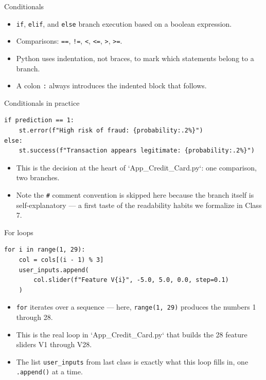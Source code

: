 \begin{frame}{Conditionals}
\begin{itemize}
\item \texttt{if}, \texttt{elif}, and \texttt{else} branch execution based on a boolean expression.
\item Comparisons: \texttt{==}, \texttt{!=}, \texttt{<}, \texttt{<=}, \texttt{>}, \texttt{>=}.
\item Python uses indentation, not braces, to mark which statements belong to a branch.
\item A colon \texttt{:} always introduces the indented block that follows.
\end{itemize}
\coursefooter
\end{frame}

\begin{frame}[fragile]{Conditionals in practice}
\begin{lstlisting}[style=coursepython]
if prediction == 1:
    st.error(f"High risk of fraud: {probability:.2%}")
else:
    st.success(f"Transaction appears legitimate: {probability:.2%}")
\end{lstlisting}
\begin{itemize}
\item This is the decision at the heart of `App_Credit_Card.py`: one comparison, two branches.
\item Note the \texttt{\#} comment convention is skipped here because the branch itself is self-explanatory --- a first taste of the readability habits we formalize in Class 7.
\end{itemize}
\coursefooter
\end{frame}

\begin{frame}[fragile]{For loops}
\begin{lstlisting}[style=coursepython]
for i in range(1, 29):
    col = cols[(i - 1) % 3]
    user_inputs.append(
        col.slider(f"Feature V{i}", -5.0, 5.0, 0.0, step=0.1)
    )
\end{lstlisting}
\begin{itemize}
\item \texttt{for} iterates over a sequence --- here, \texttt{range(1, 29)} produces the numbers 1 through 28.
\item This is the real loop in `App_Credit_Card.py` that builds the 28 feature sliders V1 through V28.
\item The list \texttt{user\_inputs} from last class is exactly what this loop fills in, one \texttt{.append()} at a time.
\end{itemize}
\coursefooter
\end{frame}

